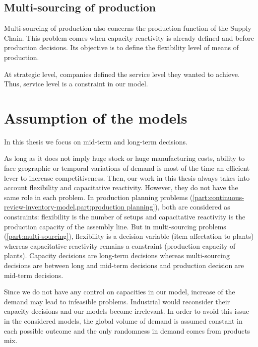 \subsection{Multi-sourcing of production}
\label{sec:business-context:argon:multi-sourcing}


Multi-sourcing of production also concerns the production function of the Supply Chain.
This problem comes when capacity reactivity is already defined and before production decisions.
Its objective is to define the flexibility level of means of production.


At strategic level, companies defined the service level they wanted to achieve.
Thus, service level is a constraint in our model.



\section{Assumption of the models}


In this thesis we focus on mid-term and long-term decisions.

As long as it does not imply huge stock or huge manufacturing costs, ability to face geographic or temporal variations of demand is most of the time an efficient lever to increase competitiveness.
Then, our work in this thesis always takes into account flexibility and capacitative reactivity.
However, they do not have the same role in each problem.
In production planning problems (\cref{part:continuous-review-inventory-model,part:production planning}), both are considered as constraints: flexibility is the number of setups and capacitative reactivity is  the production capacity of the assembly line.
But in multi-sourcing problems (\cref{part:multi-sourcing}), flexibility is a decision variable (item affectation to plants) whereas capacitative reactivity remains a constraint (production capacity of plants).
Capacity decisions are long-term decisions whereas multi-sourcing decisions are between long and mid-term decisions and production decision are mid-term decisions.


Since we do not have any control on capacities in our model, increase of the demand may lead to infeasible problems.
Industrial would reconsider their capacity decisions and our models become irrelevant.
In order to avoid this issue in the considered models, the global volume of demand is assumed constant in each possible outcome and the only randomness in demand comes from products mix.


